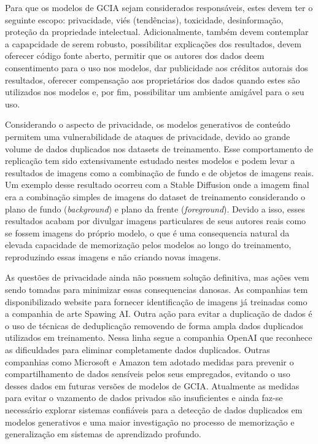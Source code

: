 Para que os modelos de GCIA sejam considerados responsáveis, estes devem ter o seguinte escopo: 
privacidade, viés (tendências), toxicidade, desinformação, proteção da propriedade intelectual. 
Adicionalmente, também devem contemplar a capapcidade de serem robusto, possibilitar explicações dos resultados,
devem oferecer código fonte aberto, permitir que os autores dos dados deem consentimento para o uso nos modelos, 
dar publicidade aos créditos autorais dos resultados, oferecer compensação aos proprietários dos dados quando 
estes são utilizados nos modelos e, por fim, possibilitar um ambiente amigável para o seu uso.

Considerando o aspecto de privacidade, os modelos generativos de conteúdo permitem uma vulnerabilidade de ataques de privacidade,
devido ao grande volume de dados duplicados nos datasets de treinamento. 
Esse comportamento de replicação tem sido extensivamente estudado nestes modelos e podem levar 
a resultados de imagens como a combinação de fundo e de objetos de imagens reais. Um exemplo desse resultado 
ocorreu com a Stable Diffusion onde a imagem  final era a combinação simples de imagens do dataset de treinamento 
considerando o plano de fundo (\textit{background}) e plano da frente (\textit{foreground}). Devido a isso, 
esses resultados acabam por divulgar imagens particulares de seus autores reais como se fossem 
imagens do próprio modelo, o que é uma consequencia natural da elevada capacidade de memorização pelos modelos ao longo
do treinamento, reproduzindo essas imagens e não criando novas imagens.

As questões de privacidade ainda não possuem solução definitiva, mas ações vem sendo tomadas para minimizar essas consequencias 
danosas. As companhias tem disponibilizado website para fornecer identificação de imagens já treinadas como a 
companhia de arte Spawing AI. 
Outra ação para evitar a duplicação de dados é o uso de técnicas de deduplicação removendo de forma ampla dados
duplicados utilizados em treinamento. Nessa linha segue a companhia OpenAI que reconhece as dificuldades para eliminar 
completamente dados duplicados. 
Outras companhias como Microsoft e Amazon tem adotado medidas para prevenir o compartilhamento de dados sensíveis pelos seus empregados, 
evitando o uso desses dados em futuras versões de modelos de GCIA.
Atualmente as medidas para evitar o vazamento de dados privados são insuficientes e 
ainda faz-se necessário explorar sistemas confiáveis para a detecção de dados duplicados em modelos generativos e uma 
maior investigação no processo de memorização e generalização em sistemas de aprendizado profundo.

